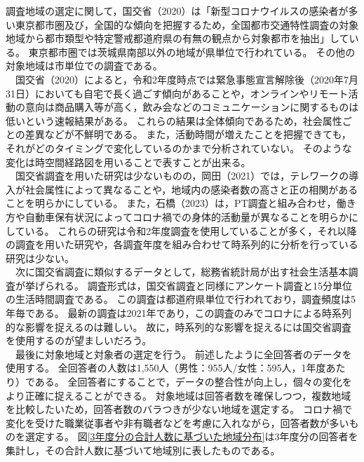 \documentclass[paper={210mm,297mm},line_length=35zw,number_of_lines=31,head_space=30mm,gutter=40mm,baselineskip=2.0zw,headfoot_verticalposition=1.5zw]{jlreq}
\begin{document}
調査地域の選定に関して，国交省（2020）は「新型コロナウイルスの感染者が多い東京都市圏及び，全国的な傾向を把握するため，全国都市交通特性調査の対象地域から都市類型や特定警戒都道府県の有無の観点から対象都市を抽出」している。
東京都市圏では茨城県南部以外の地域が県単位で行われている。
その他の対象地域は市単位での調査である。\\
　国交省（2020）によると，令和2年度時点では緊急事態宣言解除後（2020年7月31日）においても自宅で長く過ごす傾向があることや，オンラインやリモート活動の意向は商品購入等が高く，飲み会などのコミュニケーションに関するものは低いという速報結果がある。
これらの結果は全体傾向であるため，社会属性ごとの差異などが不鮮明である。
また，活動時間が増えたことを把握できても，それがどのタイミングで変化しているのかまで分析されていない。
そのような変化は時空間経路図を用いることで表すことが出来る。\\
　国交省調査を用いた研究は少ないものの，岡田（2021）では，テレワークの導入が社会属性によって異なることや，地域内の感染者数の高さと正の相関があることを明らかにしている。
また，石橋（2023）は，PT調査と組み合わせ，働き方や自動車保有状況によってコロナ禍での身体的活動量が異なることを明らかにしている。
これらの研究は令和2年度調査を使用していることが多く，それ以降の調査を用いた研究や，各調査年度を組み合わせて時系列的に分析を行っている研究は少ない。\\
　次に国交省調査に類似するデータとして，総務省統計局が出す社会生活基本調査が挙げられる。
調査形式は，国交省調査と同様にアンケート調査と15分単位の生活時間調査である。
この調査は都道府県単位で行われており，調査頻度は5年毎である。
最新の調査は2021年であり，この調査のみでコロナによる時系列的な影響を捉えるのは難しい。
故に，時系列的な影響を捉えるには国交省調査を使用するのが望ましいだろう。\\
　最後に対象地域と対象者の選定を行う。
前述したように全回答者のデータを使用する。
全回答者の人数は1,550人（男性：955人/女性：595人，1年度あたり）である。
全回答者にすることで，データの整合性が向上し，個々の変化をより正確に捉えることができる。
対象地域は回答者数を確保しつつ，複数地域を比較したいため，回答者数のバラつきが少ない地域を選定する。
コロナ禍で変化を受けた職業従事者や非有職者などを考慮に入れながら，回答者数が多いものを選定する。
図\ref{3年度分の合計人数に基づいた地域分布}は3年度分の回答者を集計し，その合計人数に基づいて地域別に表したものである。\\
\end{document}
